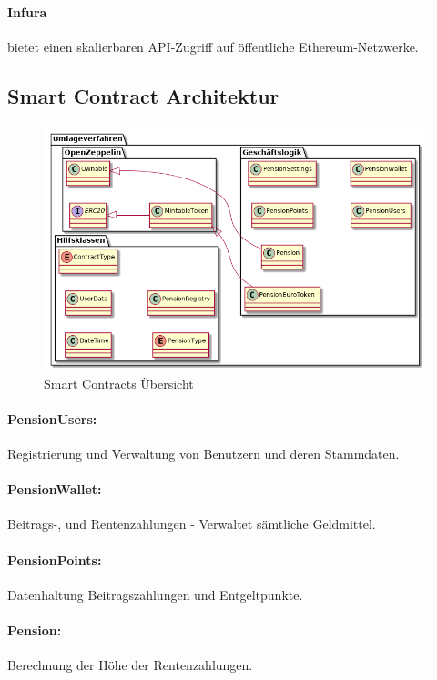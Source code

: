 \paragraph*{Infura} bietet einen skalierbaren API-Zugriff auf öffentliche Ethereum-Netzwerke.


\subsection{Smart Contract Architektur}

\begin{figure}[H]
    \centering
    \includegraphics[width=6.0in]{images/classdiagram-smartcontracts.png}
    \caption{Smart Contracts Übersicht}
    \label{fig:asure_architecture}
\end{figure}


\paragraph*{PensionUsers:} Registrierung und Verwaltung von Benutzern und deren Stammdaten.

\paragraph*{PensionWallet:} Beitrags-, und Rentenzahlungen - Verwaltet sämtliche Geldmittel.


\paragraph*{PensionPoints:} Datenhaltung Beitragszahlungen und Entgeltpunkte.

\paragraph*{Pension:} Berechnung der Höhe der Rentenzahlungen.

